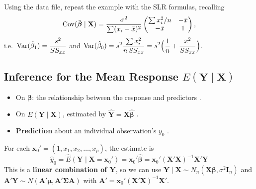 \begin{exercise}
\end{exercise}

\begin{exercise}
    Using the data file, repeat the example with the SLR formulas, recalling
    \[\operatorname{Cov}(\hat{\boldsymbol\beta}\mid\mathbf{X})=\frac{\sigma^2}{\sum(x_i-\bar x)^2}\begin{pmatrix}\sum x_i^2/n & -\bar x\\ -\bar x & 1\end{pmatrix},\]
    i.e.\ $\operatorname{Var}(\hat\beta_1)=\dfrac{s^2}{SS_{xx}}$ and $\operatorname{Var}(\hat\beta_0)=s^2\dfrac{\sum x_i^2}{n\,SS_{xx}}=s^2\Big(\dfrac1n+\dfrac{\bar x^2}{SS_{xx}}\Big)$.
\end{exercise}

\subsection{Inference for the Mean Response $E(\mathbf{Y}\mid\mathbf{X})$}

\begin{itemize}
    \item On $\boldsymbol\beta$: the relationship between the response and predictors
    .
    \item On $E(\mathbf{Y}\mid\mathbf{X})$, estimated by $\hat{\mathbf{Y}}=\mathbf{X}\hat{\boldsymbol\beta}$
    .
    \item \textbf{Prediction} about an individual observation's $y_0$
    .
\end{itemize}

\begin{definition}
    For each $\mathbf{x}_0'=(1,x_1,x_2,\dots,x_p)$, the estimate is
    \[\hat y_0=\hat E(\mathbf{Y}\mid\mathbf{X}=\mathbf{x}_0')=\mathbf{x}_0'\hat{\boldsymbol\beta}
    =\mathbf{x}_0'(\mathbf{X}'\mathbf{X})^{-1}\mathbf{X}'\mathbf{Y}\]
    This is a \textbf{linear combination of $\mathbf{Y}$}, so we can use
    $\mathbf{Y}\mid\mathbf{X}\sim N_n(\mathbf{X}\boldsymbol\beta,\sigma^2\mathbf{I}_n)$ and
    $\mathbf{A}'\mathbf{Y}\sim N(\mathbf{A}'\boldsymbol\mu,\mathbf{A}'\boldsymbol\Sigma\mathbf{A})$
    with $\mathbf{A}'=\mathbf{x}_0'(\mathbf{X}'\mathbf{X})^{-1}\mathbf{X}'$.
\end{definition}

